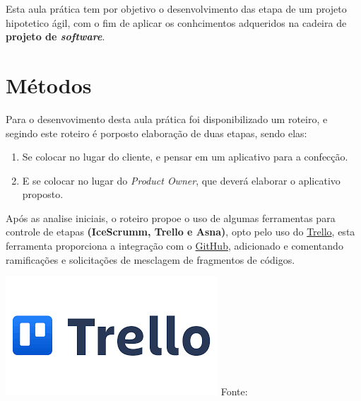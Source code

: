 \par Esta aula prática tem por objetivo o desenvolvimento das etapa de um projeto hipotetico ágil, com o fim de aplicar os conhcimentos adqueridos na cadeira de \textbf{projeto de \textit{software}}.

\section{Métodos}
\par Para o desenvovimento desta aula prática foi disponibilizado um roteiro, e segindo este roteiro é porposto elaboração de duas etapas, sendo elas:
\begin{enumerate}
  \item Se colocar no lugar do cliente, e pensar em um aplicativo para a confecção.
  \item E se colocar no lugar do \textit{Product Owner}, que deverá elaborar o aplicativo proposto.
\end{enumerate}


\noindent \begin{minipage}[c]{0.6\textwidth}
  \vspace {1cm}
\par Após as analise iniciais, o roteiro propoe o uso de algumas ferramentas para controle de etapas \textbf{(IceScrumm, Trello e Asna)}, opto pelo uso do \href{https://trello.com/home}{Trello}, esta ferramenta proporciona a integração com o \href{www.github.com}{GitHub}, adicionado e comentando ramificações e solicitações de mesclagem de fragmentos de códigos.

\end{minipage}
\begin{minipage}[c]{0.4\textwidth}
  \includegraphics[width=\textwidth]{figure/trello.png}
  \label{fig:log_trello}
  {\fontsize{10pt}{\baselineskip} \selectfont Fonte: }
\end{minipage}




